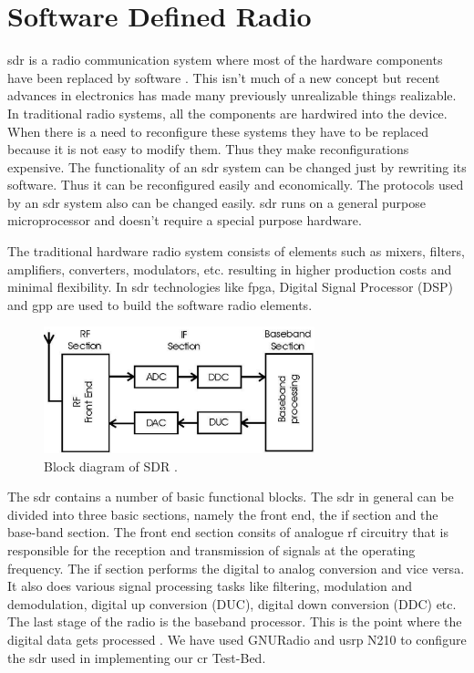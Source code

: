 \chapter{Software Defined Radio}

\gls{sdr} is a radio communication system where most of the 
hardware components have been replaced by software \cite{wikiSDR}. This isn't
much of a new concept but recent advances in electronics has made many
previously unrealizable things realizable. In traditional
radio systems, all the components are hardwired into the device. When there is
a need to reconfigure these systems they have to be replaced because it is
not easy to modify them. Thus they make reconfigurations expensive. The 
functionality of an \gls{sdr} system can be changed just by rewriting its software.
Thus it can be reconfigured easily and economically.
The protocols used by an \gls{sdr} system also can be changed
easily. \gls{sdr} runs on a general
purpose microprocessor and doesn't require a special purpose hardware.

The traditional hardware radio system consists of elements such as mixers, 
filters, amplifiers, converters, modulators, etc. resulting in higher 
production costs and minimal flexibility. In \gls{sdr} technologies like 
\gls{fpga}, Digital Signal Processor (DSP) and 
\gls{gpp} are used to build the software radio elements.


\begin{figure}
  \centering
  \includegraphics[width=0.7\textwidth]{../images/sdrBlock}
  \caption[Block diagram of SDR]{Block diagram of SDR {\cite{kranthi13}}.}
  \label{sdrBlock}
\end{figure}

The \gls{sdr} contains a number of basic functional blocks.
The \gls{sdr} in general can be divided into three basic sections, namely the front
end, the \gls{if} section and the base-band section. The front end section consits 
of analogue \gls{rf} circuitry that is responsible for the reception and 
transmission of signals at the operating frequency. The \gls{if} section performs
the digital to analog conversion and vice versa. It also does various signal 
processing tasks like filtering, modulation and demodulation, digital up 
conversion (DUC), digital down conversion (DDC) etc. The last stage of the 
radio is the baseband processor. This is the point where the digital data 
gets processed \cite{miller08}\cite{kranthi13}.
We have used GNURadio and \gls{usrp} N210 to configure the \gls{sdr} used in implementing
our \gls{cr} Test-Bed. 

